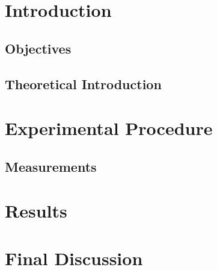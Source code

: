 \documentclass[a4paper,12pt]{article}
\begin{document}
\title{}
\author{Gabriel D'Andrade Furlanetto}
\date{}
\maketitle
\abstract{}

\pagebreak 

\section{Introduction}

\subsection{Objectives}

\subsection{Theoretical Introduction}

\section{Experimental Procedure}

\subsection{Measurements}

\section{Results}

\section{Final Discussion}

\printbibliography
\end{document}
